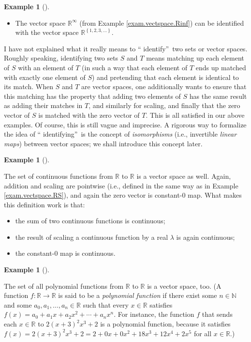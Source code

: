 \documentclass[numbers=enddot,12pt,final,onecolumn,notitlepage]{scrartcl}%
\theoremstyle{definition}
\newtheorem{exam}[theo]{Example}
\newenvironment{example}[1][]
{\begin{exam}[#1]\begin{leftbar}}
{\end{leftbar}\end{exam}}
\begin{document}
\begin{example}
\begin{itemize}
\item The vector space $\mathbb{R}^{\infty}$ (from Example
\ref{exam.vectspace.Rinf}) can be identified with the vector space
$\mathbb{R}^{\left\{  1,2,3,\ldots\right\}  }$.
\end{itemize}

I have not explained what it really means to \textquotedblleft
identify\textquotedblright\ two sets or vector spaces. Roughly speaking,
identifying two sets $S$ and $T$ means matching up each element of $S$ with an
element of $T$ (in such a way that each element of $T$ ends up matched with
exactly one element of $S$) and pretending that each element is identical to
its match. When $S$ and $T$ are vector spaces, one additionally wants to
ensure that this matching has the property that adding two elements of $S$ has
the same result as adding their matches in $T$, and similarly for scaling, and
finally that the zero vector of $S$ is matched with the zero vector of $T$.
This is all satisfied in our above examples. Of course, this is still vague
and imprecise. A rigorous way to formalize the idea of \textquotedblleft
identifying\textquotedblright\ is the concept of \textit{isomorphisms} (i.e.,
invertible \textit{linear maps}) between vector spaces; we shall introduce
this concept later.
\end{example}

\begin{example}
The set of continuous functions from $\mathbb{R}$ to $\mathbb{R}$ is a vector
space as well. Again, addition and scaling are pointwise (i.e., defined in the
same way as in Example \ref{exam.vectspace.RS}), and again the zero vector is
constant-$0$ map. What makes this definition work is that:

\begin{itemize}
\item the sum of two continuous functions is continuous;

\item the result of scaling a continuous function by a real $\lambda$ is again continuous;

\item the constant-$0$ map is continuous.
\end{itemize}
\end{example}

\begin{example}
The set of all polynomial functions from $\mathbb{R}$ to $\mathbb{R}$ is a
vector space, too. (A function $f:\mathbb{R}\rightarrow\mathbb{R}$ is said to
be a \textit{polynomial function} if there exist some $n\in\mathbb{N}$ and
some $a_{0},a_{1},\ldots,a_{n}\in\mathbb{R}$ such that every $x\in\mathbb{R}$
satisfies $f\left(  x\right)  =a_{0}+a_{1}x+a_{2}x^{2}+\cdots+a_{n}x^{n}$. For
instance, the function $f$ that sends each $x\in\mathbb{R}$ to $2\left(
x+3\right)  ^{2}x^{3}+2$ is a polynomial function, because it satisfies
$f\left(  x\right)  =2\left(  x+3\right)  ^{2}x^{3}+2=2+0x+0x^{2}%
+18x^{3}+12x^{4}+2x^{5}$ for all $x\in\mathbb{R}$.)
\end{example}
\end{document}
